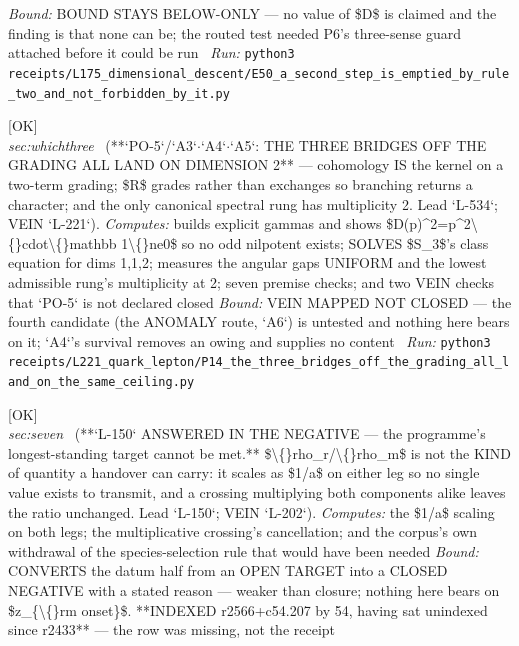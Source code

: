 \begin{description}
 \emph{Bound:} BOUND STAYS BELOW-ONLY --- no value of \$D\$ is claimed and the finding is that none can be; the routed test needed P6's three-sense guard attached before it could be run
\ \emph{Run:} \texttt{python3 receipts/L175\_dimensional\_descent/E50\_a\_second\_step\_is\_emptied\_by\_rule\_two\_and\_not\_forbidden\_by\_it.py}
\item[\label{rcpt:P14_the_three_bridges_off_the_grading_all_land_on_the_same_ceiling}\texttt{P14\_the\_three\_bridges\_off\_the\_grading\_all\_land\_on\_the\_same\_ceiling}]\hfill\textsf{[OK]}\\
\textit{sec:whichthree} \ (**`PO-5`/`A3`\ensuremath{\cdot}`A4`\ensuremath{\cdot}`A5`: THE THREE BRIDGES OFF THE GRADING ALL LAND ON DIMENSION 2** --- cohomology IS the kernel on a two-term grading; \$R\$ grades rather than exchanges so branching returns a character; and the only canonical spectral rung has multiplicity 2. Lead `L-534`; VEIN `L-221`). 
\emph{Computes:} builds explicit gammas and shows \$D(p)\textasciicircum{}2=p\textasciicircum{}2\textbackslash\{\}cdot\textbackslash\{\}mathbb 1\textbackslash\{\}ne0\$ so no odd nilpotent exists; SOLVES \$S\_3\$'s class equation for dims 1,1,2; measures the angular gaps UNIFORM and the lowest admissible rung's multiplicity at 2; seven premise checks; and two VEIN checks that `PO-5` is not declared closed
 \emph{Bound:} VEIN MAPPED NOT CLOSED --- the fourth candidate (the ANOMALY route, `A6`) is untested and nothing here bears on it; `A4`'s survival removes an owing and supplies no content
\ \emph{Run:} \texttt{python3 receipts/L221\_quark\_lepton/P14\_the\_three\_bridges\_off\_the\_grading\_all\_land\_on\_the\_same\_ceiling.py}
\item[\label{rcpt:X1_the_ratio_is_a_clock_reading_not_a_carried_datum}\texttt{X1\_the\_ratio\_is\_a\_clock\_reading\_not\_a\_carried\_datum}]\hfill\textsf{[OK]}\\
\textit{sec:seven} \ (**`L-150` ANSWERED IN THE NEGATIVE --- the programme's longest-standing target cannot be met.** \$\textbackslash\{\}rho\_r/\textbackslash\{\}rho\_m\$ is not the KIND of quantity a handover can carry: it scales as \$1/a\$ on either leg so no single value exists to transmit, and a crossing multiplying both components alike leaves the ratio unchanged. Lead `L-150`; VEIN `L-202`). 
\emph{Computes:} the \$1/a\$ scaling on both legs; the multiplicative crossing's cancellation; and the corpus's own withdrawal of the species-selection rule that would have been needed
 \emph{Bound:} CONVERTS the datum half from an OPEN TARGET into a CLOSED NEGATIVE with a stated reason --- weaker than closure; nothing here bears on \$z\_\{\textbackslash\{\}rm onset\}\$.  **INDEXED r2566+c54.207 by 54, having sat unindexed since r2433** --- the row was missing, not the receipt

\end{description}
